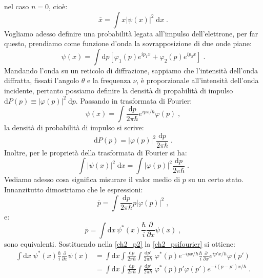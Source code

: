 \documentclass[10pt,a4paper]{report}
\theoremstyle{definition}
\numberwithin{equation}{section}
\newcommand{\diff}[1][]{\mathrm{d}#1}
\begin{document}
nel caso $n=0$, cioè:
\begin{equation}
\bar{x}=\int x|\psi(x)|^2\;\diff{x}\;.
\end{equation}
Vogliamo adesso definire una probabilità legata all'impulso dell'elettrone, per far questo, prendiamo come funzione d'onda la sovrapposizione di due onde piane:
\begin{equation}
\psi(x)=\int \diff{p}[\varphi_1(p)e^{ip_1x}+\varphi_2(p)e^{ip_2x}]\;.
\end{equation}
Mandando l'onda su un reticolo di diffrazione, sappiamo che l'intensità dell'onda diffratta, fissati l'angolo $\theta$ e la frequenza $\nu$, è proporzionale all'intensità dell'onda incidente, pertanto possiamo definire la densità di propabilità di impulso $\diff{P(p)}\equiv|\varphi(p)|^2\;\diff{p}$. Passando in trasformata di Fourier:
\begin{equation}
\psi(x)=\int \frac{\diff{p}}{2\pi\hbar}e^{ipx/\hbar}\varphi(p)\;, \label{ch2_psifourier}
\end{equation}
la densità di probabilità di impulso si scrive:
\begin{equation}
\diff{P(p)}=|\varphi(p)|^2\frac{\diff{p}}{2\pi\hbar}\;.
\end{equation}
Inoltre, per le proprietà della trasformata di Fourier si ha:
\begin{equation}
\int |\psi(x)|^2\;\diff{x}=\int |\varphi(p)|^2\frac{\diff{p}}{2\pi\hbar}\;.
\end{equation}
Vediamo adesso cosa significa misurare il valor medio di $p$ su un certo stato. Innanzitutto dimostriamo che le espressioni:
\begin{equation}
\bar{p}=\int\frac{\diff{p}}{2\pi\hbar}p|\varphi(p)|^2\;, \label{ch2_p1}
\end{equation}
e:
\begin{equation}
\bar{p}=\int\diff{x}\,\psi^*(x)\frac{\hbar}{i}\frac{\partial}{\partial x}\psi(x)\;, \label{ch2_p2}
\end{equation}
sono equivalenti. Sostituendo nella \eqref{ch2_p2} la \eqref{ch2_psifourier} si ottiene:
\begin{align*}
\int \diff{x}\; \psi^*(x)\frac{\hbar}{i}\frac{\partial}{\partial x}\psi(x) &= \int \diff{x}\int \frac{\diff{p}}{2\pi\hbar}\int \frac{\diff{p'}}{2\pi\hbar}\;\varphi^*(p)e^{-ipx/\hbar}\frac{\hbar}{i}\frac{\partial}{\partial x}
e^{ip'x/\hbar}\varphi(p') \\
&= \int \diff{x}\int\frac{\diff{p}}{2\pi\hbar}\int\frac{\diff{p'}}{2\pi\hbar}\;\varphi^*(p)p'\varphi(p')e^{-i(p-p')x/\hbar}\;.
\end{align*}
\end{document}
